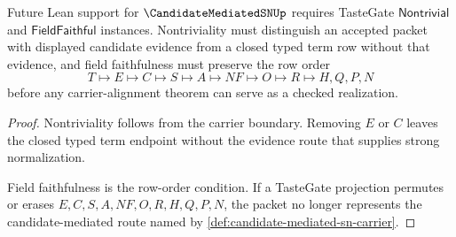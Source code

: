 \begin{theorem}
\label{thm:candidate-mediated-sn-tastegate-obligation}
Future Lean support for $\CandidateMediatedSNUp$ requires TasteGate $\mathsf{Nontrivial}$ and $\mathsf{FieldFaithful}$ instances. Nontriviality must distinguish an accepted packet with displayed candidate evidence from a closed typed term row without that evidence, and field faithfulness must preserve the row order
$$
T \longmapsto E \longmapsto C \longmapsto S \longmapsto A \longmapsto NF \longmapsto O \longmapsto R \longmapsto H,Q,P,N
$$
before any carrier-alignment theorem can serve as a checked realization.
\end{theorem}
\begin{proof}
Nontriviality follows from the carrier boundary. Removing $E$ or $C$ leaves the closed typed term endpoint without the evidence route that supplies strong normalization.

Field faithfulness is the row-order condition. If a TasteGate projection permutes or erases $E,C,S,A,NF,O,R,H,Q,P,N$, the packet no longer represents the candidate-mediated route named by \autoref{def:candidate-mediated-sn-carrier}.
\end{proof}




